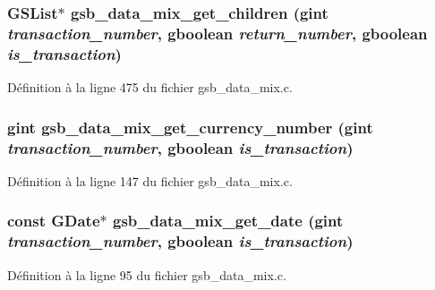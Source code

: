 \subsubsection[{gsb\_\-data\_\-mix\_\-get\_\-children}]{\setlength{\rightskip}{0pt plus 5cm}GSList$\ast$ gsb\_\-data\_\-mix\_\-get\_\-children (gint {\em transaction\_\-number}, \/  gboolean {\em return\_\-number}, \/  gboolean {\em is\_\-transaction})}\label{gsb__data__mix_8c_ac42d68a2260ed0ac4bc59dc65d4475b4}


Définition à la ligne 475 du fichier gsb\_\-data\_\-mix.c.

\subsubsection[{gsb\_\-data\_\-mix\_\-get\_\-currency\_\-number}]{\setlength{\rightskip}{0pt plus 5cm}gint gsb\_\-data\_\-mix\_\-get\_\-currency\_\-number (gint {\em transaction\_\-number}, \/  gboolean {\em is\_\-transaction})}\label{gsb__data__mix_8c_ab20294d6e3c998c6ad5b05783b0f3f9e}


Définition à la ligne 147 du fichier gsb\_\-data\_\-mix.c.

\subsubsection[{gsb\_\-data\_\-mix\_\-get\_\-date}]{\setlength{\rightskip}{0pt plus 5cm}const GDate$\ast$ gsb\_\-data\_\-mix\_\-get\_\-date (gint {\em transaction\_\-number}, \/  gboolean {\em is\_\-transaction})}\label{gsb__data__mix_8c_a60cef843742c4b8ab778e9e368f6853c}


Définition à la ligne 95 du fichier gsb\_\-data\_\-mix.c.


